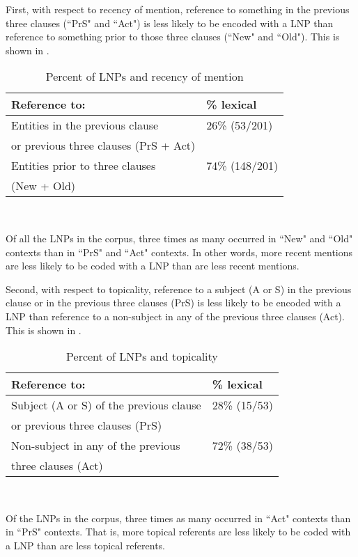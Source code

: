 First, with respect to recency of mention, reference to something in the previous three clauses (``PrS" and ``Act") is less likely to be encoded with a LNP than reference to something prior to those three clauses (``New" and ``Old"). This is shown in .
\begin{table}[htp] 
\begin{center}
\caption{\small{Percent of LNPs and recency of mention}}
\begin{tabular}{| l | l |}\hline
 Reference to: & {\%} lexical \\
\hline
Entities in the previous clause & 26{\%} (53/201) \\
or previous three clauses (PrS + Act)  & \\
\hline
Entities prior to three clauses & 74{\%} (148/201) \\
(New + Old)  & \\
\hline 
\end{tabular}\\
\label{recency}
\end{center}
\end{table}
Of all the LNPs in the corpus, three times as many occurred in ``New" and ``Old" contexts than in ``PrS" and ``Act" contexts. In other words, more recent mentions are less likely to be coded with a LNP than are less recent mentions.

Second, with respect to topicality, reference to a subject (A or S) in the previous clause or in the previous three clauses (PrS) is less likely to be encoded with a LNP than reference to a non-subject in any of the previous three clauses (Act). This is shown in .
\begin{table}[htp] 
\begin{center}
\caption{\small{Percent of LNPs and topicality}}
\begin{tabular}{| l | l |}\hline
 Reference to: & {\%} lexical \\
\hline
Subject (A or S) of the previous clause & 28{\%} (15/53)  \\
or previous three clauses (PrS)  & \\
\hline
Non-subject in any of the previous & 72{\%} (38/53) \\
 three clauses (Act)  & \\
\hline
\end{tabular}\\
\label{topicality}
\end{center}
\end{table}
Of the LNPs in the corpus, three times as many occurred in ``Act" contexts than in  ``PrS" contexts. That is, more topical referents are less likely to be coded with a LNP than are less topical referents. 


